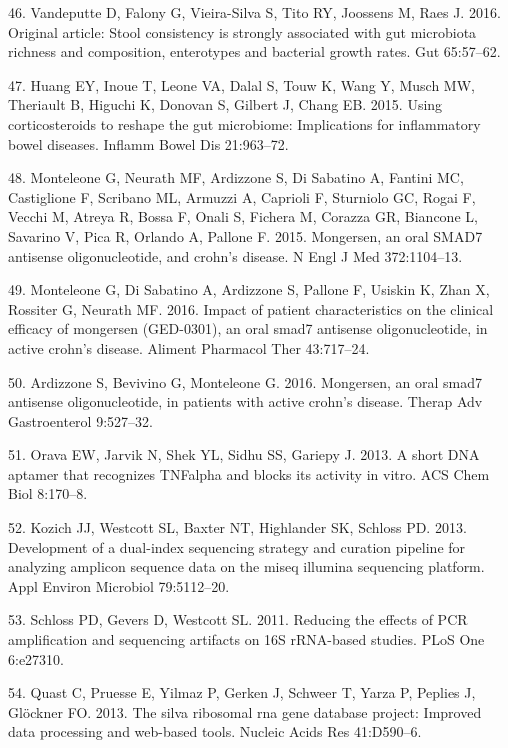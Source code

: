 \documentclass[11pt,]{article}
\begin{document}
\hypertarget{ref-vandeputte_stoolcon_2016}{}
46. Vandeputte D, Falony G, Vieira-Silva S, Tito RY, Joossens M, Raes J.
2016. Original article: Stool consistency is strongly associated with
gut microbiota richness and composition, enterotypes and bacterial
growth rates. Gut 65:57--62.

\hypertarget{ref-huang_cort_2015}{}
47. Huang EY, Inoue T, Leone VA, Dalal S, Touw K, Wang Y, Musch MW,
Theriault B, Higuchi K, Donovan S, Gilbert J, Chang EB. 2015. Using
corticosteroids to reshape the gut microbiome: Implications for
inflammatory bowel diseases. Inflamm Bowel Dis 21:963--72.

\hypertarget{ref-monteleone_mongersen_2015}{}
48. Monteleone G, Neurath MF, Ardizzone S, Di Sabatino A, Fantini MC,
Castiglione F, Scribano ML, Armuzzi A, Caprioli F, Sturniolo GC, Rogai
F, Vecchi M, Atreya R, Bossa F, Onali S, Fichera M, Corazza GR, Biancone
L, Savarino V, Pica R, Orlando A, Pallone F. 2015. Mongersen, an oral
SMAD7 antisense oligonucleotide, and crohn's disease. N Engl J Med
372:1104--13.

\hypertarget{ref-monteleone_mongersen_2016}{}
49. Monteleone G, Di Sabatino A, Ardizzone S, Pallone F, Usiskin K, Zhan
X, Rossiter G, Neurath MF. 2016. Impact of patient characteristics on
the clinical efficacy of mongersen (GED-0301), an oral smad7 antisense
oligonucleotide, in active crohn's disease. Aliment Pharmacol Ther
43:717--24.

\hypertarget{ref-ardizzone_mongersen_2016}{}
50. Ardizzone S, Bevivino G, Monteleone G. 2016. Mongersen, an oral
smad7 antisense oligonucleotide, in patients with active crohn's
disease. Therap Adv Gastroenterol 9:527--32.

\hypertarget{ref-orava_short_2013}{}
51. Orava EW, Jarvik N, Shek YL, Sidhu SS, Gariepy J. 2013. A short DNA
aptamer that recognizes TNFalpha and blocks its activity in vitro. ACS
Chem Biol 8:170--8.

\hypertarget{ref-Kozich_MiSeqSOP_2013}{}
52. Kozich JJ, Westcott SL, Baxter NT, Highlander SK, Schloss PD. 2013.
Development of a dual-index sequencing strategy and curation pipeline
for analyzing amplicon sequence data on the miseq illumina sequencing
platform. Appl Environ Microbiol 79:5112--20.

\hypertarget{ref-schloss_PCRartifacts_2011}{}
53. Schloss PD, Gevers D, Westcott SL. 2011. Reducing the effects of PCR
amplification and sequencing artifacts on 16S rRNA-based studies. PLoS
One 6:e27310.

\hypertarget{ref-Quast_silva_2013}{}
54. Quast C, Pruesse E, Yilmaz P, Gerken J, Schweer T, Yarza P, Peplies
J, Glöckner FO. 2013. The silva ribosomal rna gene database project:
Improved data processing and web-based tools. Nucleic Acids Res
41:D590--6.
\end{document}
